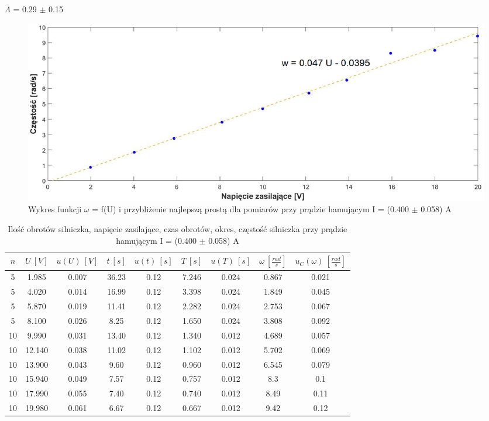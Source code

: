 \documentclass[12pt, a4paper, oneside]{article}
\begin{document}
\begin{center}
$\bar{\Lambda}$ = 0.29 $\pm$ 0.15
\end{center}
\begin{figure}[h]
\centering
\caption{Wykres funkcji $\omega$ = f(U) i przybliżenie najlepszą prostą dla pomiarów przy prądzie hamującym I = (0.400 $\pm$ 0.058) A}
\includegraphics[scale=0.3]{f4.png}
\end{figure}
\begin{table}[h]
  \centering
  \caption{Ilość obrotów silniczka, napięcie zasilające, czas obrotów, okres, częstość silniczka przy prądzie hamującym I = (0.400 $\pm$ 0.058) A}
    \begin{tabular}{|c|c|c|c|c|c|c|c|c|}\hline
    $n$ & $U~[V]$ & $u(U)~[V]$ & $t~[s]$ & $u(t)~[s]$ & $T~[s]$ & $u(T)~[s]$ & $\omega~[\frac{rad}{s}]$ & $u_C(\omega)~[\frac{rad}{s}]$
 \\\hline
    5 & 1.985 & 0.007 & 36.23 & 0.12 & 7.246 & 0.024 & 0.867 & 0.021 \\\hline
    5 & 4.020 & 0.014 & 16.99 & 0.12 & 3.398 & 0.024 & 1.849 & 0.045 \\\hline
    5 & 5.870 & 0.019 & 11.41 & 0.12 & 2.282 & 0.024 & 2.753 & 0.067 \\\hline
    5 & 8.100 & 0.026 & 8.25 & 0.12 & 1.650 & 0.024 & 3.808 & 0.092 \\\hline
    10 & 9.990 & 0.031 & 13.40 & 0.12 & 1.340 & 0.012 & 4.689 & 0.057 \\\hline
    10 & 12.140 & 0.038 & 11.02 & 0.12 & 1.102 & 0.012 & 5.702 & 0.069 \\\hline
    10 & 13.900 & 0.043 & 9.60 & 0.12 & 0.960 & 0.012 & 6.545 & 0.079 \\\hline
    10 & 15.940 & 0.049 & 7.57 & 0.12 & 0.757 & 0.012 & 8.3 & 0.1 \\\hline
    10 & 17.990 & 0.055 & 7.40 & 0.12 & 0.740 & 0.012 & 8.49 & 0.11 \\\hline
    10 & 19.980 & 0.061 & 6.67 & 0.12 & 0.667 & 0.012 & 9.42 & 0.12 \\\hline
    \end{tabular}%
  \label{tab:addlabel}%
\end{table}%
\end{document}
